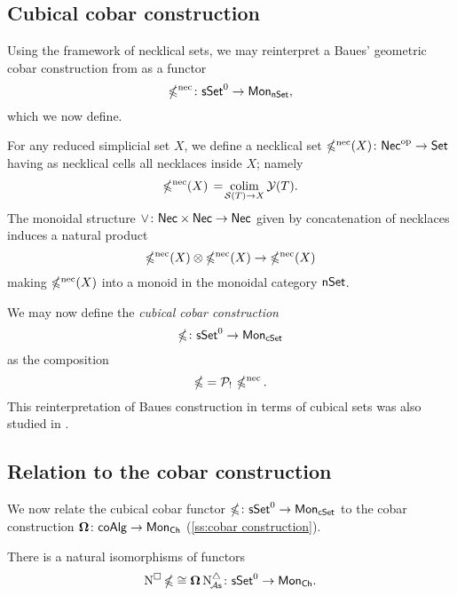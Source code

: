 \subsection{Cubical cobar construction} \label{ss:cubical cobar}

Using the framework of necklical sets, we may reinterpret a Baues' geometric cobar construction from \cite{baues1998hopf} as a functor
\[
\operatorname{\mathbb{\Omega}^{\mathrm{nec}}} \colon \mathsf{sSet}^0 \to \mathsf{Mon}_{\mathsf{nSet}},
\]
which we now define.

For any reduced simplicial set $X$, we define a necklical set $\operatorname{\mathbb{\Omega}^{\mathrm{nec}}}(X) \colon \mathsf{Nec}^{\mathrm{op}} \to \mathsf{Set}$ having as necklical cells all necklaces inside $X$; namely
\[
\operatorname{\mathbb{\Omega}^{\mathrm{nec}}}(X) \, = \! \operatorname*{colim}_{\mathcal{S}(T) \to X} \mathcal{Y}(T).
\]
The monoidal structure $\vee \colon \mathsf{Nec} \times \mathsf{Nec} \to \mathsf{Nec}$ given by concatenation of necklaces induces a natural product
\[
\operatorname{\mathbb{\Omega}^{\mathrm{nec}}}(X) \otimes \operatorname{\mathbb{\Omega}^{\mathrm{nec}}}(X) \to \operatorname{\mathbb{\Omega}^{\mathrm{nec}}}(X)
\]
making $\operatorname{\mathbb{\Omega}^{\mathrm{nec}}}(X)$ into a monoid in the monoidal category $\mathsf{nSet}$.

We may now define the \textit{cubical cobar construction}
\[
\operatorname{\mathbb{\Omega}} \colon \mathsf{sSet}^0 \to \mathsf{Mon}_{\mathsf{cSet}}
\]
as the composition
\[
\operatorname{\mathbb{\Omega}} = \mathcal{P}_! \, \operatorname{\mathbb{\Omega}^{\mathrm{nec}}}.
\]
This reinterpretation of Baues construction in terms of cubical sets was also studied in \cite{rivera2018cubical}.

\subsection{Relation to the cobar construction}

We now relate the cubical cobar functor $\operatorname{\mathbb{\Omega}} \colon \mathsf{sSet}^0 \to \mathsf{Mon}_{\mathsf{cSet}}$ to the cobar construction $\operatorname{\mathbf{\Omega}} \colon \mathsf{coAlg} \to \mathsf{Mon}_{\mathsf{Ch}}$ (\cref{ss:cobar construction}).

\begin{lemma} \label{l:ccobar and cobar}
	There is a natural isomorphisms of functors
	\[
	\operatorname{N^{\square}} \operatorname{\mathbb{\Omega}} \cong \operatorname{\mathbf{\Omega}} \operatorname{N^{\triangle}_{\!{\mathcal{A}\mathsf{s}}}} \colon \mathsf{sSet}^0 \to \mathsf{Mon}_{\mathsf{Ch}}.
	\]
\end{lemma}


